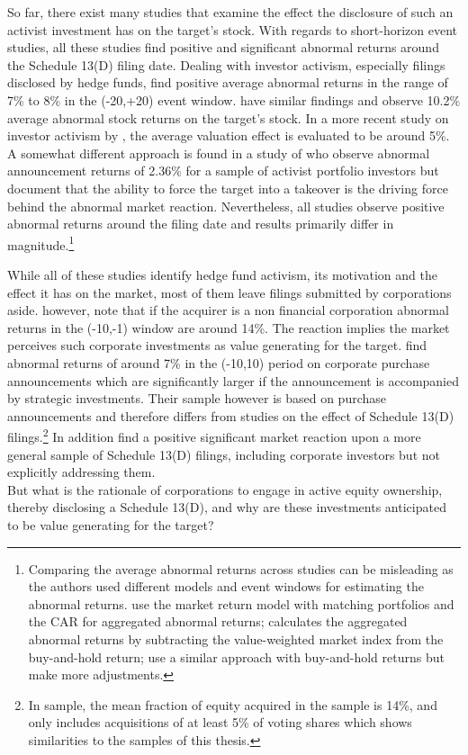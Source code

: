 \documentclass[12pt]{article}
\begin{document}
So far, there exist many studies that examine the effect the disclosure of such an activist investment has on the target's stock. With regards to short-horizon event studies, all these studies find positive and significant abnormal returns around the Schedule 13(D) filing date. 
Dealing with investor activism, especially filings disclosed by hedge funds, \citet[p.1730]{Brav2008} find positive average abnormal returns in the range of 7\% to 8\% in the (-20,+20) event window. \citet[p.188]{Klein2009} have similar findings and observe 10.2\% average abnormal stock returns on the target's stock. In a more recent study on investor activism by \citet[p.410]{Denes2017}, the average valuation effect is evaluated to be around 5\%. A somewhat different approach is found in a study of \citet[p.363]{Greenwood2009} who observe abnormal announcement returns of 2.36\% for a sample of activist portfolio investors but document that the ability to force the target into a takeover is the driving force behind the abnormal market reaction. Nevertheless, all studies observe positive abnormal returns around the filing date and results primarily differ in magnitude.\footnote{Comparing the average abnormal returns across studies can be misleading as the authors used different models and event windows for estimating the abnormal returns. \citet{Greenwood2009} use the market return model with matching portfolios and the CAR for aggregated abnormal returns; \citet{Brav2008} calculates the aggregated abnormal returns by subtracting the value-weighted market index from the buy-and-hold return; \citet{Klein2009} use a similar approach with buy-and-hold returns but make more adjustments.}

While all of these studies identify hedge fund activism, its motivation and the effect it has on the market, most of them leave filings submitted by corporations aside. \citet[p.29]{Brigida2012} however, note that if the acquirer is a non financial corporation abnormal returns in the (-10,-1) window are around 14\%. The reaction implies the market perceives such corporate investments as value generating for the target. \citet[p.2803]{Allen2000} find abnormal returns of around 7\% in the (-10,10) period on corporate purchase announcements which are significantly larger if the announcement is accompanied by strategic investments. Their sample however is based on purchase announcements and therefore differs from studies on the effect of Schedule 13(D) filings.\footnote{In \citet[p.2801]{Allen2000} sample, the mean fraction of equity acquired in the sample is 14\%, and  only includes acquisitions of at least 5\% of voting shares which shows similarities to the samples of this thesis.} In addition \citet{Collin-Dufresne2015} find a positive significant market reaction upon a more general sample of Schedule 13(D) filings, including corporate investors but not explicitly addressing them.\\
But what is the rationale of corporations to engage in active equity ownership, thereby disclosing a Schedule 13(D), and why are these investments anticipated to be value generating for the target?
\end{document}

